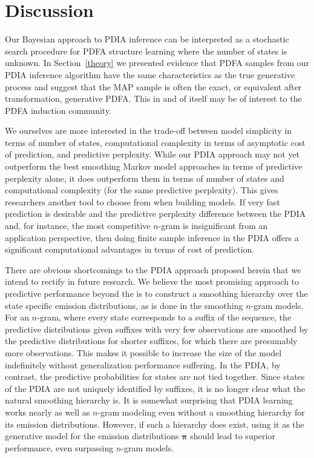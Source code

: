 \section{Discussion}

Our Bayesian approach to PDIA inference can be interpreted as a stochastic search procedure for PDFA structure learning where the number of states is unknown.  In Section~\ref{theory} we presented evidence that PDFA samples from our PDIA inference algorithm have the same characteristics as the true generative process and suggest that the MAP sample is often the exact, or equivalent after transformation, generative PDFA.  This in and of itself may be of interest to the PDFA induction community.

We ourselves are more interested in the trade-off between model simplicity in terms of number of states, computational complexity in terms of asymptotic cost of prediction, and predictive perplexity.  While our PDIA approach may not yet outperform the best smoothing Markov model approaches in terms of predictive perplexity alone, it does outperform them in terms of number of states and computational complexity (for the same predictive perplexity).  This gives researchers another tool to choose from when building models.  If very fast prediction is desirable and the predictive perplexity difference between the PDIA and, for instance, the most competitive $n$-gram is insignificant from an application perspective, then doing finite sample inference in the PDIA offers a significant computational advantages in terms of cost of prediction.

There are obvious shortcomings to the PDIA approach proposed herein that we intend to rectify in future research.  We believe the most promising approach to predictive performance beyond the is to construct a smoothing hierarchy over the state specific emission distributions, as is done in the smoothing $n$-gram models.  For an $n$-gram, where every state corresponds to a suffix of the sequence, the predictive distributions given suffixes with very few observations are smoothed by the predictive distributions for shorter suffixes, for which there are presumably more observations.  This makes it possible to increase the size of the model indefinitely without generalization performance suffering.  In the PDIA, by contrast, the predictive probabilities for states are not tied together.  Since states of the PDIA are not uniquely identified by suffixes, it is no longer clear what the natural smoothing hierarchy is.  It is somewhat surprising that PDIA learning works nearly as well as $n$-gram modeling even without a smoothing hierarchy for its emission distributions.  However, if such a hierarchy does exist, using it as the generative model for the emission distributions $\boldsymbol\pi$ should lead to superior performance, even surpassing $n$-gram models.

